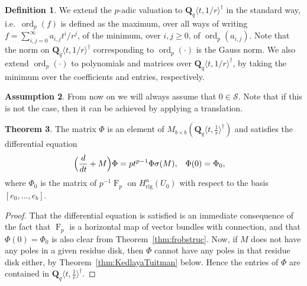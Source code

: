 \documentclass[a4paper,11pt]{article}
\numberwithin{equation}{section}
\newcommand{\QQ}{\mathbf{Q}} %
\DeclareMathOperator{\ord}{ord}          %
\DeclareMathOperator{\Frob}{F}           %
\providecommand{\Hrig}{H_{\text{rig}}}  %
\theoremstyle{definition}
\newtheorem{thm}{Theorem}[section]
\newtheorem{defn}[thm]{Definition}
\newtheorem{assump}[thm]{Assumption}
\begin{document}
\begin{defn}
We extend the $p$-adic valuation 
to $\QQ_q \langle t, 1/r \rangle^{\dag}$ in the standard way, i.e.\ 
$\ord_p(f)$ is defined as the maximum, over all ways of writing 
$f = \sum_{i,j=0}^{\infty} a_{i,j} t^i / r^j$,
of the minimum, over $i,j \geq 0$, of $\ord_p(a_{i,j})$. Note that the  
norm on $\QQ_q \langle t, 1/r \rangle^{\dag}$ corresponding to $\ord_p(\cdot)$ 
is the Gauss norm. We also extend $\ord_p(\cdot)$ to polynomials and matrices over 
$\QQ_q \langle t, 1/r \rangle^{\dag}$, by taking the 
minimum over the coefficients and entries, respectively.
\end{defn}

\begin{assump} \label{assump:S}
From now on we will always assume that $0 \in \mathcal{S}$. 
Note that if this is not the case, then it can be achieved by 
applying a translation.
\end{assump}

\begin{thm} \label{thm:eqphi} 
The matrix $\Phi$ is an element of 
$M_{b \times b}(\QQ_q \langle t, \frac{1}{r} \rangle^{\dag})$ 
and satisfies the differential equation
\begin{align*}
\Bigl(\frac{d}{dt} + M\Bigr) \Phi &= p t^{p-1} \Phi \sigma(M), &\Phi(0)& = \Phi_0,
\end{align*}
where $\Phi_0$ is the 
matrix of $p^{-1}\Frob_p$ on $\Hrig^n(U_0)$ with respect to the 
basis $[e_0,\dotsc,e_b]$.
\end{thm}

\begin{proof}
That the differential equation is satisfied is an immediate consequence of the 
fact that $\Frob_p$ is a horizontal map of vector bundles with connection, and 
that $\Phi(0)=\Phi_0$ is also clear from Theorem~\ref{thm:frobstruc}. Now, if 
$M$ does not have any poles in a given residue disk, then $\Phi$ cannot have 
any poles in that residue disk either, by Theorem~\ref{thm:KedlayaTuitman} 
below. Hence the entries of $\Phi$ are contained in 
$\QQ_q \langle t, \frac{1}{r} \rangle^{\dag}$.
\end{proof}
\end{document}
